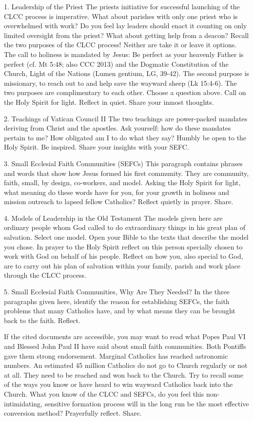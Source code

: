 \documentclass[oneside]{book}
\begin{document}
1. Leadership of the Priest The priests initiative for successful launching of
the CLCC process is imperative. What about parishes with only one priest who is
overwhelmed with work? Do you feel lay leaders should enact it counting on only
limited oversight from the priest? What about getting help from a deacon? Recall
the two purposes of the CLCC process! Neither are take it or leave it options.
The call to holiness is mandated by Jesus: Be perfect as your heavenly Father is
perfect (cf. Mt 5:48; also CCC 2013) and the Dogmatic Constitution of the
Church, Light of the Nations (Lumen gentium, LG, 39-42). The second purpose is
missionary, to reach out to and help save the wayward sheep (Lk 15:4-6). The two
purposes are complimentary to each other. Choose a question above. Call on the
Holy Spirit for light. Reflect in quiet. Share your inmost thoughts.

2. Teachings of Vatican Council II The two teachings are power-packed mandates
deriving from Christ and the apostles. Ask yourself: how do these mandates
pertain to me? How obligated am I to do what they say?  Humbly be open to the
Holy Spirit. Be inspired. Share your insights with your SEFC.

3. Small Ecclesial Faith Communities (SEFCs) This paragraph contains phrases and
words that show how Jesus formed his first community. They are community, faith,
small, by design, co-workers, and model. Asking the Holy Spirit for light, what
meaning do these words have for you, for your growth in holiness and mission
outreach to lapsed fellow Catholics? Reflect quietly in prayer. Share.

4. Models of Leadership in the Old Testament The models given here are ordinary
people whom God called to do extraordinary things in his great plan of
salvation. Select one model. Open your Bible to the texts that describe the
model you chose. In prayer to the Holy Spirit reflect on this person specially
chosen to work with God on behalf of his people. Reflect on how you, also
special to God, are to carry out his plan of salvation within your family,
parish and work place through the CLCC process.

5. Small Ecclesial Faith Communities, Why Are They Needed?  In the three
paragraphs given here, identify the reason for establishing SEFCs, the faith
problems that many Catholics have, and by what means they can be brought back to
the faith. Reflect.

If the cited documents are accessible, you may want to read what Popes Paul VI
and Blessed John Paul II have said about small faith communities. Both Pontiffs
gave them strong endorsement. Marginal Catholics has reached astronomic
numbers. An estimated 45 million Catholics do not go to Church regularly or not
at all. They need to be reached and won back to the Church. Try to recall some
of the ways you know or have heard to win wayward Catholics back into the
Church. What you know of the CLCC and SEFCs, do you feel this non-intimidating,
sensitive formation process will in the long run be the most effective
conversion method? Prayerfully reflect. Share.
\end{document}
